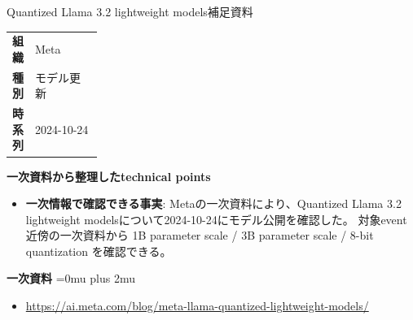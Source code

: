 \begin{technicalnote}{Quantized Llama 3.2 lightweight models}{補足資料}
\begingroup
\begin{tabularx}{\linewidth}{@{}>{\bfseries}p{0.22\linewidth}X@{}}
組織 & Meta \\
種別 & モデル更新 \\
時系列 & 2024-10-24 \\
\end{tabularx}
\smallskip
{\bfseries 一次資料から整理したtechnical points}
\begin{itemize}[leftmargin=1.5em,itemsep=0.35em]
\item \textbf{一次情報で確認できる事実}: Metaの一次資料により、Quantized Llama 3.2 lightweight modelsについて2024-10-24にモデル公開を確認した。 対象event近傍の一次資料から 1B parameter scale / 3B parameter scale / 8-bit quantization を確認できる。
\end{itemize}
\begin{minipage}{\linewidth}
\begin{samepage}
{\bfseries 一次資料}
\begingroup\sloppy
\Urlmuskip=0mu plus 2mu\relax
\begin{itemize}[leftmargin=1.5em,itemsep=0.25em]
\item {\scriptsize\url{https://ai.meta.com/blog/meta-llama-quantized-lightweight-models/}}
\end{itemize}
\endgroup
\end{samepage}
\end{minipage}
\endgroup
\end{technicalnote}
\medskip
